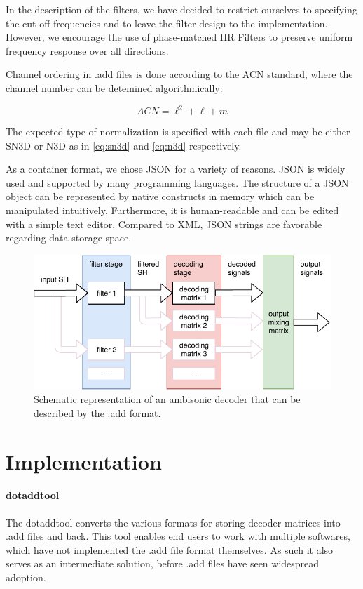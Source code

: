 \documentclass[a4paper, 10pt, twocolumn]{article}
\begin{document}
In the description of the filters, we have decided to restrict ourselves to specifying the cut-off frequencies and to leave the filter design to the implementation. However, we encourage the use of phase-matched IIR Filters to preserve uniform frequency response over all directions.

Channel ordering in .add files is done according to the ACN standard, where the channel number can be detemined algorithmically:

\begin{equation}
    ACN=\ell^{2}+\ell+m
\end{equation}

The expected type of normalization is specified with each file and may be either SN3D or N3D as in \eqref{eq:sn3d} and \eqref{eq:n3d} respectively.

As a container format, we chose JSON for a variety of reasons. JSON is widely used and supported by many programming languages. The structure of a JSON object can be represented by native constructs in memory which can be manipulated intuitively. Furthermore, it is human-readable and can be edited with a simple text editor. Compared to XML, JSON strings are favorable regarding data storage space.

\vspace{2mm}
\begin{figure}[htb]
\includegraphics[width=\the\linewidth]{decoding.pdf}
\caption{Schematic representation of an ambisonic decoder that can be described by the .add format.}
\end{figure}
\vspace{2mm}

\section{Implementation} \label{sec:Implementation}

\paragraph{dotaddtool} 
The dotaddtool converts the various formats for storing decoder matrices into .add files and back. This tool enables end users to work with multiple softwares, which have not implemented the .add file format themselves. As such it also serves as an intermediate solution, before .add files have seen widespread adoption.
\end{document}
